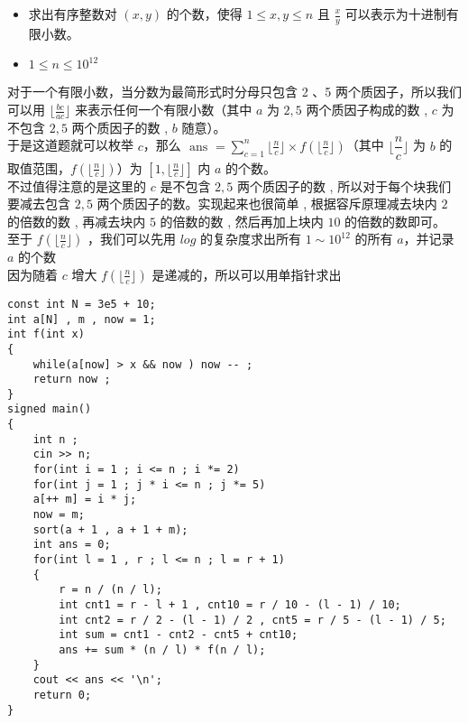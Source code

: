 \documentclass[E:/GsjzTle/main/main.tex]{subfiles}
\begin{document}
\begin{itemize}
\item
  求出有序整数对 \((x,y)\) 的个数，使得 \(1\le x,y\le n\) 且
  \(\frac{x}{y}\) 可以表示为十进制有限小数。
\item
  \(1 \le n \le 10^{12}\)
\end{itemize}

对于一个有限小数，当分数为最简形式时分母只包含 2 、5
两个质因子，所以我们可以用 \(\lfloor\frac{bc}{ac}\rfloor\)
来表示任何一个有限小数（其中 \(a\) 为 \(2,5\) 两个质因子构成的数 , \(c\)
为不包含 \(2,5\) 两个质因子的数 , \(b\) 随意）。\\
于是这道题就可以枚举 \(c\)，那么
\(\text { ans }=\sum_{c=1}^{n} \lfloor\frac{n}{c}\rfloor \times f\left(\lfloor\frac{n}{c}\rfloor\right)\)（其中
\(\lfloor\dfrac{n}{c}\rfloor\) 为 \(b\)
的取值范围，\(f(\lfloor\frac{n}{c}\rfloor)\)）为
\([1,\lfloor\frac{n}{c}\rfloor]\) 内 \(a\) 的个数。\\
不过值得注意的是这里的 \(c\) 是不包含 \(2,5\) 两个质因子的数 ,
所以对于每个块我们要减去包含 \(2,5\) 两个质因子的数。实现起来也很简单 ,
根据容斥原理减去块内 \(2\) 的倍数的数 , 再减去块内 \(5\) 的倍数的数 ,
然后再加上块内 \(10\) 的倍数的数即可。\\
至于 \(f(\lfloor\frac{n}{c}\rfloor)\) ，我们可以先用 \(log\)
的复杂度求出所有 \(1\sim10^{12}\) 的所有 \(a\)，并记录 \(a\) 的个数\\
因为随着 \(c\) 增大 \(f(\lfloor\frac{n}{c}\rfloor)\)
是递减的，所以可以用单指针求出

\begin{lstlisting}
const int N = 3e5 + 10;
int a[N] , m , now = 1; 
int f(int x)
{
	while(a[now] > x && now ) now -- ;
	return now ;
}
signed main()
{
	int n ;
	cin >> n;
	for(int i = 1 ; i <= n ; i *= 2)
	for(int j = 1 ; j * i <= n ; j *= 5)
	a[++ m] = i * j;
	now = m;
	sort(a + 1 , a + 1 + m);
	int ans = 0;
	for(int l = 1 , r ; l <= n ; l = r + 1)
	{
		r = n / (n / l);
		int cnt1 = r - l + 1 , cnt10 = r / 10 - (l - 1) / 10;
		int cnt2 = r / 2 - (l - 1) / 2 , cnt5 = r / 5 - (l - 1) / 5;
		int sum = cnt1 - cnt2 - cnt5 + cnt10;
		ans += sum * (n / l) * f(n / l);
	}
	cout << ans << '\n';
	return 0;
}
\end{lstlisting}
\end{document}
